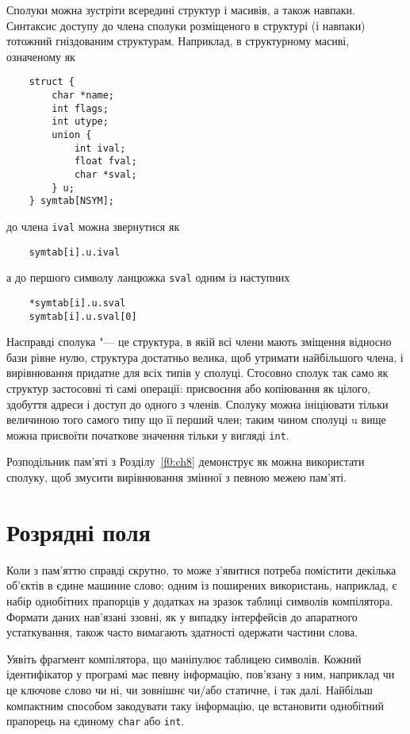 \documentclass[a4paper,12pt]{book}
\begin{document}
  Сполуки можна зустріти всередині структур і масивів, а також навпаки. Синтаксис
  доступу до члена сполуки розміщеного в структурі (і навпаки) тотожний гніздованим
  структурам. Наприклад, в структурному масиві, означеному як
  \begin{verbatim}
    struct {
        char *name;
        int flags;
        int utype;
        union {
            int ival;
            float fval;
            char *sval;
        } u;
    } symtab[NSYM];
  \end{verbatim}
  до члена \texttt{ival} можна звернутися як
  \begin{verbatim}
    symtab[i].u.ival
  \end{verbatim}
  а до першого символу ланцюжка \texttt{sval} одним із наступних
  \begin{verbatim}
    *symtab[i].u.sval
    symtab[i].u.sval[0]
  \end{verbatim}

  Насправді сполука "--- це структура, в якій всі члени мають зміщення відносно бази рівне
  нулю, структура достатньо велика, щоб утримати найбільшого члена, і вирівнювання
  придатне для всіх типів у сполуці. Стосовно сполук так само як структур застосовні ті
  самі операції: присвоєння або копіювання як цілого, здобуття адреси і доступ до одного
  з членів. Сполуку можна ініціювати тільки величиною того самого типу що її перший член;
  таким чином сполуці u вище можна присвоїти початкове значення тільки у вигляді
  \texttt{int}.

  Розподільник пам'яті з Розділу~\ref{f0:ch8} демонструє як можна використати
  сполуку, щоб змусити вирівнювання змінної з певною межею пам'яті.

\section{Розрядні поля}


  Коли з пам'яттю справді скрутно, то може з'явитися потреба помістити декілька об'єктів в
  єдине машинне слово; одним із поширених використань, наприклад, є набір однобітних
  прапорців у додатках на зразок таблиці символів компілятора. Формати даних нав'язані
  ззовні, як у випадку інтерфейсів до апаратного устаткування, також часто вимагають
  здатності одержати частини слова.

  Уявіть фрагмент компілятора, що маніпулює таблицею символів. Кожний ідентифікатор у
  програмі має певну інформацію, пов'язану з ним, наприклад чи це ключове слово чи
  ні, чи зовнішнє чи/або статичне, і так далі. Найбільш компактним способом закодувати
  таку інформацію, це встановити однобітний прапорець на єдиному
  \texttt{char} або \texttt{int}.
\end{document}
